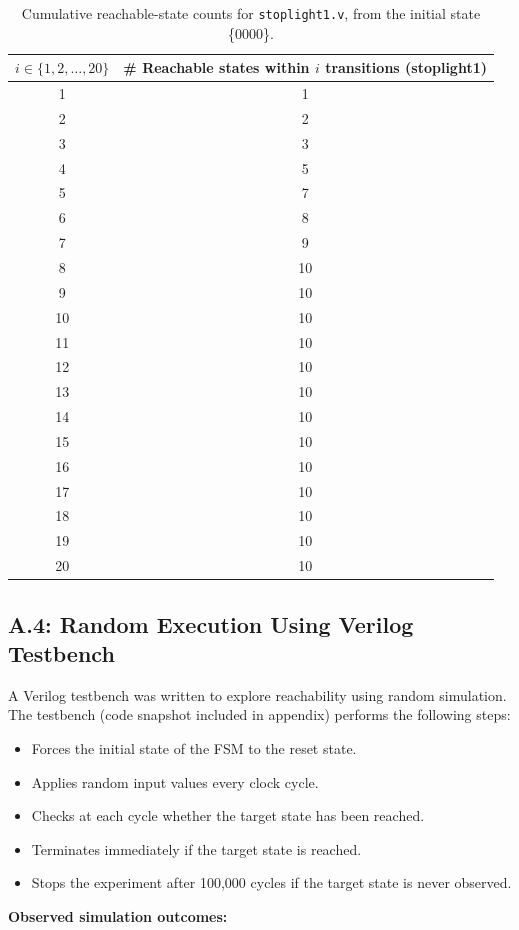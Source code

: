 \documentclass[10pt]{article}
\begin{document}
\begin{table}[h]
\centering
\begin{tabular}{c|c}
\toprule
$i \in \{1,2,\dots,20\}$ & \# Reachable states within $i$ transitions (stoplight1) \\
\midrule
1  & 1 \\
2  & 2 \\
3  & 3 \\
4  & 5 \\
5  & 7 \\
6  & 8 \\
7  & 9 \\
8  & 10 \\
9  & 10 \\
10 & 10 \\
11 & 10 \\
12 & 10 \\
13 & 10 \\
14 & 10 \\
15 & 10 \\
16 & 10 \\
17 & 10 \\
18 & 10 \\
19 & 10 \\
20 & 10 \\
\bottomrule
\end{tabular}
\caption{Cumulative reachable-state counts for \texttt{stoplight1.v}, from the initial state \{0000\}.}
\label{tab:a3_stoplight1}
\end{table}
\subsection*{A.4: Random Execution Using Verilog Testbench}

A Verilog testbench was written to explore reachability using random simulation. The testbench (code snapshot included in appendix) performs the following steps:

\begin{itemize}
\item Forces the initial state of the FSM to the reset state.
\item Applies random input values every clock cycle.
\item Checks at each cycle whether the target state has been reached.
\item Terminates immediately if the target state is reached.
\item Stops the experiment after 100{,}000 cycles if the target state is never observed.
\end{itemize}
\vspace{0.3cm}
\noindent
\textbf{Observed simulation outcomes:}
\end{document}
